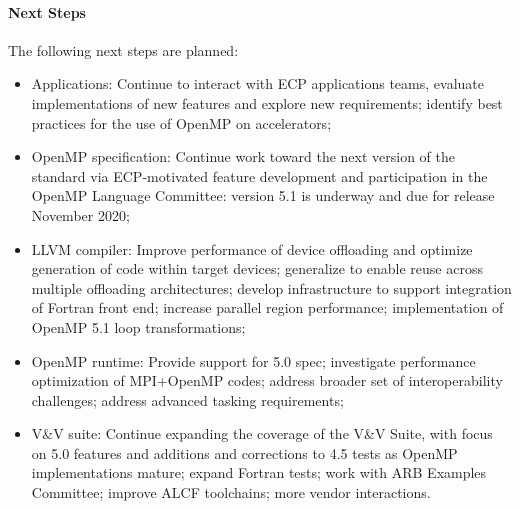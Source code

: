\paragraph{Next Steps}
The following next steps are planned:
\begin{itemize}
\item Applications: Continue to interact with ECP applications teams, evaluate implementations of new features and explore new requirements; identify best practices for the use of OpenMP on accelerators;

\item OpenMP specification: Continue work toward the next version of the standard via ECP-motivated feature development and participation in the OpenMP Language Committee: version 5.1 is underway and due for release November 2020;

\item LLVM compiler: Improve performance of device offloading and optimize generation of code within target devices; generalize to enable reuse across multiple offloading architectures; develop infrastructure to support integration of Fortran front end; increase parallel region performance; implementation of OpenMP 5.1 loop transformations;

\item  OpenMP runtime: Provide support for 5.0 spec; investigate performance optimization of MPI+OpenMP codes; address broader set of interoperability challenges; address advanced tasking requirements; 

\item V\&V suite: Continue expanding the coverage of the V\&V Suite, with focus on 5.0 features and additions and corrections to 4.5 tests as OpenMP implementations mature; expand Fortran tests; work with ARB Examples Committee; improve ALCF toolchains; more vendor interactions.
\end{itemize} 




